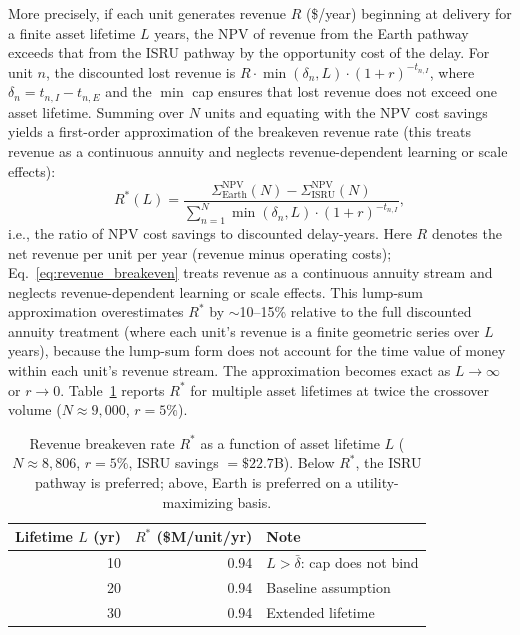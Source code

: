 \documentclass[preprint,12pt]{elsarticle}
\begin{document}
More precisely, if each unit generates revenue $R$ (\$/year) beginning at delivery for a finite asset lifetime $L$ years, the NPV of revenue from the Earth pathway exceeds that from the ISRU pathway by the opportunity cost of the delay. For unit $n$, the discounted lost revenue is $R \cdot \min(\delta_n, L) \cdot (1+r)^{-t_{n,I}}$, where $\delta_n = t_{n,I} - t_{n,E}$ and the $\min$ cap ensures that lost revenue does not exceed one asset lifetime. Summing over $N$ units and equating with the NPV cost savings yields a first-order approximation of the breakeven revenue rate (this treats revenue as a continuous annuity and neglects revenue-dependent learning or scale effects):
\begin{equation}
  R^*(L) = \frac{\Sigma_{\mathrm{Earth}}^{\mathrm{NPV}}(N) - \Sigma_{\mathrm{ISRU}}^{\mathrm{NPV}}(N)}{\sum_{n=1}^{N} \min(\delta_n, L) \cdot (1+r)^{-t_{n,I}}},
  \label{eq:revenue_breakeven}
\end{equation}
i.e., the ratio of NPV cost savings to discounted delay-years. Here $R$ denotes the net revenue per unit per year (revenue minus operating costs); Eq.~\ref{eq:revenue_breakeven} treats revenue as a continuous annuity stream and neglects revenue-dependent learning or scale effects. This lump-sum approximation overestimates $R^*$ by $\sim$10--15\% relative to the full discounted annuity treatment (where each unit's revenue is a finite geometric series over $L$ years), because the lump-sum form does not account for the time value of money within each unit's revenue stream. The approximation becomes exact as $L \to \infty$ or $r \to 0$. Table~\ref{tab:revenue_breakeven} reports $R^*$ for multiple asset lifetimes at twice the crossover volume ($N \approx 9{,}000$, $r = 5\%$).

\begin{table}[htbp]
\centering
\caption{Revenue breakeven rate $R^*$ as a function of asset lifetime $L$ ($N \approx 8{,}806$, $r = 5\%$, ISRU savings $= \$22.7$B). Below $R^*$, the ISRU pathway is preferred; above, Earth is preferred on a utility-maximizing basis.}
\label{tab:revenue_breakeven}
\small
\begin{tabular}{@{}rrl@{}}
\toprule
Lifetime $L$ (yr) & $R^*$ (\$M/unit/yr) & Note \\
\midrule
10  & 0.94  & $L > \bar{\delta}$: cap does not bind \\
20  & 0.94  & Baseline assumption \\
30  & 0.94  & Extended lifetime \\
\bottomrule
\end{tabular}
\end{table}
\end{document}

